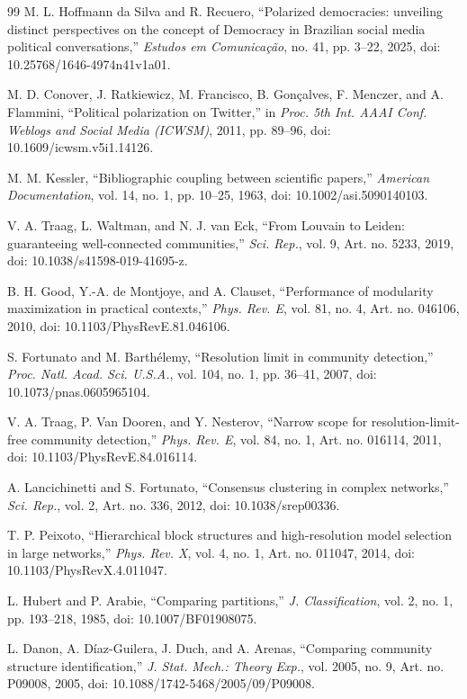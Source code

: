 \documentclass[12pt,a4paper,oneside]{article}
\begin{document}
\begin{thebibliography}{99}
 M. L. Hoffmann da Silva and R. Recuero, ``Polarized democracies: unveiling distinct perspectives on the concept of Democracy in Brazilian social media political conversations,'' \emph{Estudos em Comunicação}, no. 41, pp. 3–22, 2025, doi: 10.25768/1646-4974n41v1a01.

 M. D. Conover, J. Ratkiewicz, M. Francisco, B. Gonçalves, F. Menczer, and A. Flammini, ``Political polarization on Twitter,'' in \emph{Proc. 5th Int. AAAI Conf. Weblogs and Social Media (ICWSM)}, 2011, pp. 89–96, doi: 10.1609/icwsm.v5i1.14126.

 M. M. Kessler, ``Bibliographic coupling between scientific papers,'' \emph{American Documentation}, vol. 14, no. 1, pp. 10–25, 1963, doi: 10.1002/asi.5090140103.

 V. A. Traag, L. Waltman, and N. J. van Eck, ``From Louvain to Leiden: guaranteeing well-connected communities,'' \emph{Sci. Rep.}, vol. 9, Art. no. 5233, 2019, doi: 10.1038/s41598-019-41695-z.

 B. H. Good, Y.-A. de Montjoye, and A. Clauset, ``Performance of modularity maximization in practical contexts,'' \emph{Phys. Rev. E}, vol. 81, no. 4, Art. no. 046106, 2010, doi: 10.1103/PhysRevE.81.046106.

 S. Fortunato and M. Barthélemy, ``Resolution limit in community detection,'' \emph{Proc. Natl. Acad. Sci. U.S.A.}, vol. 104, no. 1, pp. 36–41, 2007, doi: 10.1073/pnas.0605965104.

 V. A. Traag, P. Van Dooren, and Y. Nesterov, ``Narrow scope for resolution-limit-free community detection,'' \emph{Phys. Rev. E}, vol. 84, no. 1, Art. no. 016114, 2011, doi: 10.1103/PhysRevE.84.016114.

 A. Lancichinetti and S. Fortunato, ``Consensus clustering in complex networks,'' \emph{Sci. Rep.}, vol. 2, Art. no. 336, 2012, doi: 10.1038/srep00336.

 T. P. Peixoto, ``Hierarchical block structures and high-resolution model selection in large networks,'' \emph{Phys. Rev. X}, vol. 4, no. 1, Art. no. 011047, 2014, doi: 10.1103/PhysRevX.4.011047.

 L. Hubert and P. Arabie, ``Comparing partitions,'' \emph{J. Classification}, vol. 2, no. 1, pp. 193–218, 1985, doi: 10.1007/BF01908075.

 L. Danon, A. Díaz-Guilera, J. Duch, and A. Arenas, ``Comparing community structure identification,'' \emph{J. Stat. Mech.: Theory Exp.}, vol. 2005, no. 9, Art. no. P09008, 2005, doi: 10.1088/1742-5468/2005/09/P09008.

\end{thebibliography}
\end{document}

